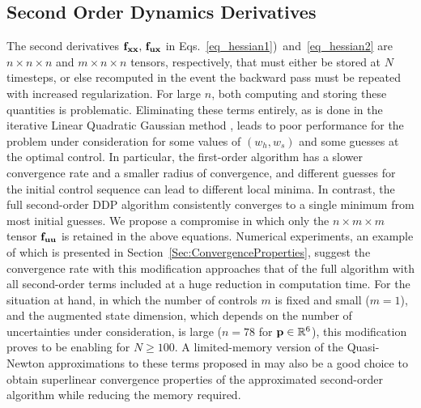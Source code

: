 
\subsection{Second Order Dynamics Derivatives}\label{Sec:DDP_Simplification}
The second derivatives $\mathbf{f}_{\mathbf{x}\mathbf{x}},\, \mathbf{f}_{\mathbf{u}\mathbf{x}}$ in Eqs.~\eqref{eq_hessian1})~and~\eqref{eq_hessian2} are $n\times n\times n$ and $m\times n\times n$ tensors, respectively, that must either be stored at $N$ timesteps, or else recomputed in the event the backward pass must be repeated with increased regularization. For large $n$, both computing and storing these quantities is problematic. Eliminating these terms entirely, as is done in the iterative Linear Quadratic Gaussian method \cite{iLQG}, leads to poor performance for the problem under consideration for some values of $(w_h,w_s)$ and some guesses at the optimal control. In particular, the first-order algorithm has a slower convergence rate and a smaller radius of convergence, and different guesses for the initial control sequence can lead to different local minima. In contrast, the full second-order DDP algorithm consistently converges to a single minimum from most initial guesses. We propose a compromise in which only the $n\times m \times m$ tensor $\mathbf{f}_{\mathbf{u}\mathbf{u}}$ is retained in the above equations. Numerical experiments, an example of which is presented in Section~\ref{Sec:ConvergenceProperties}, suggest the convergence rate with this modification approaches that of the full algorithm with all second-order terms included at a huge reduction in computation time. For the situation at hand, in which the number of controls $m$ is fixed and small ($ m=1 $), and the augmented state dimension, which depends on the number of uncertainties under consideration, is large ($n=78$ for $\mathbf{p}\in\mathbb{R}^6$), this modification proves to be enabling for $N\geq 100$. A limited-memory version of the Quasi-Newton approximations to these terms proposed in \cite{QNDDP} may also be a good choice to obtain superlinear convergence properties of the approximated second-order algorithm while reducing the memory required. 

